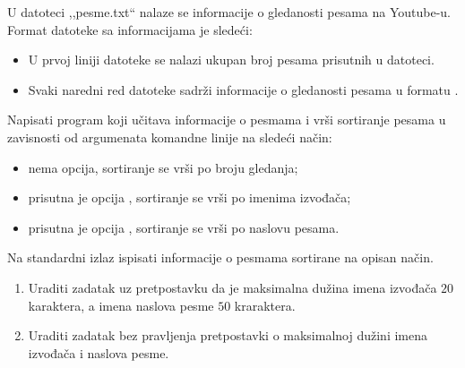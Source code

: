 \begin{Answer}[ref=513]
\end{Answer}
\begin{Exercise}[label=514]
U datoteci ,,pesme.txt`` nalaze se informacije o gledanosti pesama na
Youtube-u. Format datoteke sa informacijama je sledeći:
\begin{itemize}
\item U prvoj liniji datoteke se nalazi ukupan broj pesama prisutnih u
  datoteci.
\item Svaki naredni red datoteke sadrži informacije o gledanosti
  pesama u formatu .
\end{itemize}
Napisati program koji učitava informacije o pesmama i vrši sortiranje
pesama u zavisnosti od argumenata komandne linije na sledeći način:
\begin{itemize}
\item nema opcija, sortiranje se vrši po broju gledanja;
\item prisutna je opcija , sortiranje se vrši po imenima
  izvođača;
\item prisutna je opcija , sortiranje se vrši po naslovu
  pesama.
\end{itemize}
Na standardni izlaz ispisati informacije o pesmama sortirane na opisan
način.
\begin{enumerate}
\item Uraditi zadatak uz pretpostavku da je maksimalna dužina imena
  izvođača $20$ karaktera, a imena naslova pesme $50$ kraraktera.
\item Uraditi zadatak bez pravljenja pretpostavki o maksimalnoj dužini
  imena izvođača i naslova pesme.
\end{enumerate}


\end{Exercise}
